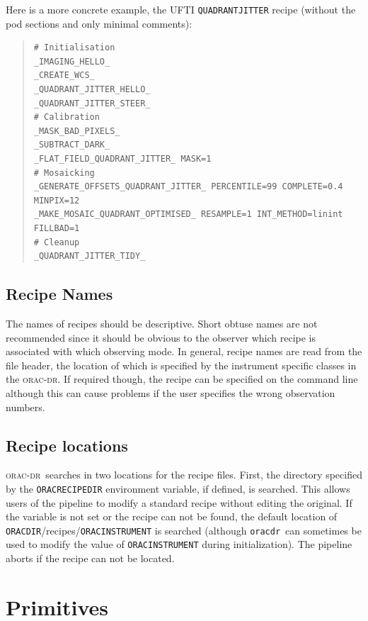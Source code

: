 \documentclass[twoside,11pt]{article}
\renewcommand{\_}{\texttt{\symbol{95}}}
\newcommand{\Oracdr}{\textsc{orac-dr}}
\newcommand{\oracdr}{\texttt{oracdr}}
\newenvironment{myquote}{\begin{quote}\begin{small}}{\end{small}\end{quote}}
\begin{document}
Here is a more concrete example, the UFTI \texttt{QUADRANT\_JITTER} recipe
(without the pod sections and only minimal comments):

\begin{myquote}
\begin{verbatim}
# Initialisation
_IMAGING_HELLO_
_CREATE_WCS_
_QUADRANT_JITTER_HELLO_
_QUADRANT_JITTER_STEER_
# Calibration
_MASK_BAD_PIXELS_
_SUBTRACT_DARK_
_FLAT_FIELD_QUADRANT_JITTER_ MASK=1
# Mosaicking
_GENERATE_OFFSETS_QUADRANT_JITTER_ PERCENTILE=99 COMPLETE=0.4 MINPIX=12
_MAKE_MOSAIC_QUADRANT_OPTIMISED_ RESAMPLE=1 INT_METHOD=linint FILLBAD=1
# Cleanup
_QUADRANT_JITTER_TIDY_
\end{verbatim}
\end{myquote}


\subsection{Recipe Names}

The names of recipes should be descriptive. Short obtuse names are not
recommended since it should be obvious to the observer which recipe is
associated with which observing mode. In general, recipe names are
read from the file header, the location of which is specified by the
instrument specific classes in the \Oracdr. If required though, the
recipe can be specified on the command line although this can cause
problems if the user specifies the wrong observation numbers.

\subsection{Recipe locations}

\Oracdr\ searches in two locations for the recipe files. First, the directory
specified by the \texttt{ORAC\_\-RECIPE\_DIR} environment variable, if
defined, is searched. This allows users of the pipeline to modify a standard
recipe without editing the original. If the variable is not set or the recipe
can not be found, the default location of
\texttt{ORAC\_DIR}/recipes/\texttt{ORAC\_INSTRUMENT} is searched (although
\oracdr\ can sometimes be used to modify the value of
\texttt{ORAC\_INSTRUMENT} during initialization). The pipeline aborts if the
recipe can not be located.



\section{Primitives}
\end{document}
